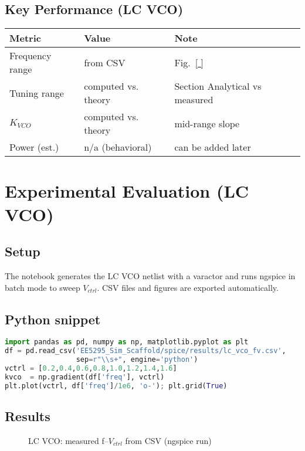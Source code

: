 \subsection*{Key Performance (LC VCO)}
\begin{table}[H]
  \centering
  \begin{tabular}{lll}
    \toprule
    Metric & Value & Note \\
    \midrule
    Frequency range & from CSV & Fig.~\ref{ } \\
    Tuning range & computed vs. theory & Section Analytical vs measured \\
    $K_{VCO}$ & computed vs. theory & mid-range slope \\
    Power (est.) & n/a (behavioral) & can be added later \\
    \bottomrule
  \end{tabular}
\end{table}


\section{Experimental Evaluation (LC VCO)}
\subsection*{Setup}
The notebook generates the LC VCO netlist with a varactor and runs ngspice in batch mode to sweep \(V_{ctrl}\). CSV files and figures are exported automatically.

\subsection*{Python snippet}
\begin{lstlisting}[language=Python]
import pandas as pd, numpy as np, matplotlib.pyplot as plt
df = pd.read_csv('EE5295_Sim_Scaffold/spice/results/lc_vco_fv.csv',
                 sep=r"\\s+", engine='python')
vctrl = [0.2,0.4,0.6,0.8,1.0,1.2,1.4,1.6]
kvco  = np.gradient(df['freq'], vctrl)
plt.plot(vctrl, df['freq']/1e6, 'o-'); plt.grid(True)
\end{lstlisting}

\subsection*{Results}
\begin{figure}[H]
  \centering
  \caption{LC VCO: measured f--$V_{ctrl}$ from CSV (ngspice run)}
\end{figure}

